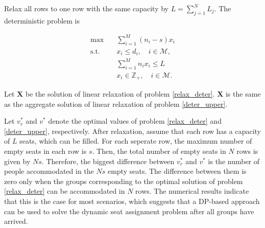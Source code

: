 Relax all rows to one row with the same capacity by $L = \sum_{j=1}^{N} L_j$. The deterministic problem is

\begin{equation}\label{relax_deter}
  \begin{aligned}
  \max \quad & \sum_{i=1}^{M} (n_i- s) x_{i} \\
  \text {s.t.} \quad & x_{i} \leq d_{i}, \quad i \in \mathcal{M}, \\
  & \sum_{i=1}^{M} n_{i} x_{i} \leq L \\
  & x_{i} \in \mathbb{Z}_{+}, \quad i \in \mathcal{M}.
  \end{aligned}
\end{equation}

\begin{lem}
 Let $\mathbf{X}$ be the solution of linear relaxation of problem \eqref{relax_deter}. $\mathbf{X}$ is the same as the aggregate
 solution of linear relaxation of problem \eqref{deter_upper}.
\end{lem}





Let $v_{r}^{*}$ and $v^{*}$ denote the optimal values of problem \eqref{relax_deter} and \eqref{deter_upper}, respectively. After relaxation, assume that each row has a capacity of $L$ seats, which can be filled. For each seperate row, the maximum number of empty seats in each row is $s$. Then, the total number of empty seats in $N$ rows is given by $Ns$. Therefore, the biggest difference between $v_{r}^{*}$ and $v^{*}$ is the number of people accommodated in the $Ns$ empty seats.
The difference between them is zero only when the groups corresponding to the optimal solution of problem \eqref{relax_deter} can be accommodated in $N$ rows. The numerical results indicate that this is the case for most scenarios, which suggests that a DP-based approach can be used to solve the dynamic seat assignment problem after all groups have arrived.


